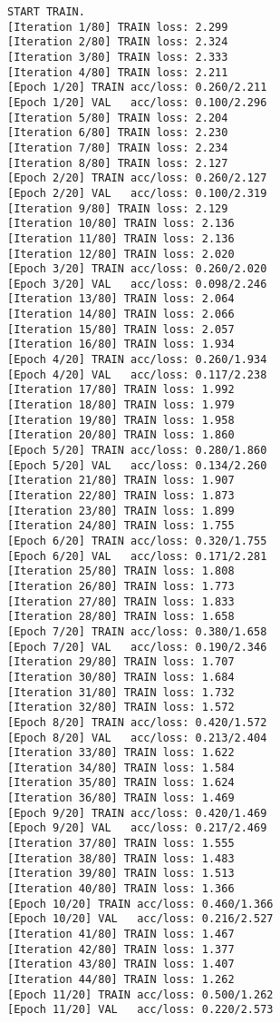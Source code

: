\documentclass[11pt]{article}
\begin{document}
    \begin{Verbatim}[commandchars=\\\{\}]
START TRAIN.
[Iteration 1/80] TRAIN loss: 2.299
[Iteration 2/80] TRAIN loss: 2.324
[Iteration 3/80] TRAIN loss: 2.333
[Iteration 4/80] TRAIN loss: 2.211
[Epoch 1/20] TRAIN acc/loss: 0.260/2.211
[Epoch 1/20] VAL   acc/loss: 0.100/2.296
[Iteration 5/80] TRAIN loss: 2.204
[Iteration 6/80] TRAIN loss: 2.230
[Iteration 7/80] TRAIN loss: 2.234
[Iteration 8/80] TRAIN loss: 2.127
[Epoch 2/20] TRAIN acc/loss: 0.260/2.127
[Epoch 2/20] VAL   acc/loss: 0.100/2.319
[Iteration 9/80] TRAIN loss: 2.129
[Iteration 10/80] TRAIN loss: 2.136
[Iteration 11/80] TRAIN loss: 2.136
[Iteration 12/80] TRAIN loss: 2.020
[Epoch 3/20] TRAIN acc/loss: 0.260/2.020
[Epoch 3/20] VAL   acc/loss: 0.098/2.246
[Iteration 13/80] TRAIN loss: 2.064
[Iteration 14/80] TRAIN loss: 2.066
[Iteration 15/80] TRAIN loss: 2.057
[Iteration 16/80] TRAIN loss: 1.934
[Epoch 4/20] TRAIN acc/loss: 0.260/1.934
[Epoch 4/20] VAL   acc/loss: 0.117/2.238
[Iteration 17/80] TRAIN loss: 1.992
[Iteration 18/80] TRAIN loss: 1.979
[Iteration 19/80] TRAIN loss: 1.958
[Iteration 20/80] TRAIN loss: 1.860
[Epoch 5/20] TRAIN acc/loss: 0.280/1.860
[Epoch 5/20] VAL   acc/loss: 0.134/2.260
[Iteration 21/80] TRAIN loss: 1.907
[Iteration 22/80] TRAIN loss: 1.873
[Iteration 23/80] TRAIN loss: 1.899
[Iteration 24/80] TRAIN loss: 1.755
[Epoch 6/20] TRAIN acc/loss: 0.320/1.755
[Epoch 6/20] VAL   acc/loss: 0.171/2.281
[Iteration 25/80] TRAIN loss: 1.808
[Iteration 26/80] TRAIN loss: 1.773
[Iteration 27/80] TRAIN loss: 1.833
[Iteration 28/80] TRAIN loss: 1.658
[Epoch 7/20] TRAIN acc/loss: 0.380/1.658
[Epoch 7/20] VAL   acc/loss: 0.190/2.346
[Iteration 29/80] TRAIN loss: 1.707
[Iteration 30/80] TRAIN loss: 1.684
[Iteration 31/80] TRAIN loss: 1.732
[Iteration 32/80] TRAIN loss: 1.572
[Epoch 8/20] TRAIN acc/loss: 0.420/1.572
[Epoch 8/20] VAL   acc/loss: 0.213/2.404
[Iteration 33/80] TRAIN loss: 1.622
[Iteration 34/80] TRAIN loss: 1.584
[Iteration 35/80] TRAIN loss: 1.624
[Iteration 36/80] TRAIN loss: 1.469
[Epoch 9/20] TRAIN acc/loss: 0.420/1.469
[Epoch 9/20] VAL   acc/loss: 0.217/2.469
[Iteration 37/80] TRAIN loss: 1.555
[Iteration 38/80] TRAIN loss: 1.483
[Iteration 39/80] TRAIN loss: 1.513
[Iteration 40/80] TRAIN loss: 1.366
[Epoch 10/20] TRAIN acc/loss: 0.460/1.366
[Epoch 10/20] VAL   acc/loss: 0.216/2.527
[Iteration 41/80] TRAIN loss: 1.467
[Iteration 42/80] TRAIN loss: 1.377
[Iteration 43/80] TRAIN loss: 1.407
[Iteration 44/80] TRAIN loss: 1.262
[Epoch 11/20] TRAIN acc/loss: 0.500/1.262
[Epoch 11/20] VAL   acc/loss: 0.220/2.573

\end{Verbatim}
\end{document}
